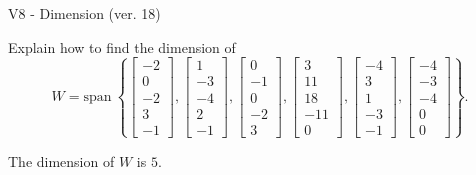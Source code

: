\begin{exercise}
  \begin{exerciseTitle}V8 - Dimension (ver. 18)\end{exerciseTitle}
  \begin{exerciseStatement}
    Explain how to find the dimension of 
\[W=\mathrm{span}\ \left\{\left[\begin{array}{r}
-2 \\
0 \\
-2 \\
3 \\
-1
\end{array}\right] , \left[\begin{array}{r}
1 \\
-3 \\
-4 \\
2 \\
-1
\end{array}\right] , \left[\begin{array}{r}
0 \\
-1 \\
0 \\
-2 \\
3
\end{array}\right] , \left[\begin{array}{r}
3 \\
11 \\
18 \\
-11 \\
0
\end{array}\right] , \left[\begin{array}{r}
-4 \\
3 \\
1 \\
-3 \\
-1
\end{array}\right] , \left[\begin{array}{r}
-4 \\
-3 \\
-4 \\
0 \\
0
\end{array}\right]\right\}.\]



  \end{exerciseStatement}
  \begin{exerciseAnswer}
   The dimension of \(W\) is  \(5\).
  


  \end{exerciseAnswer}
\end{exercise}